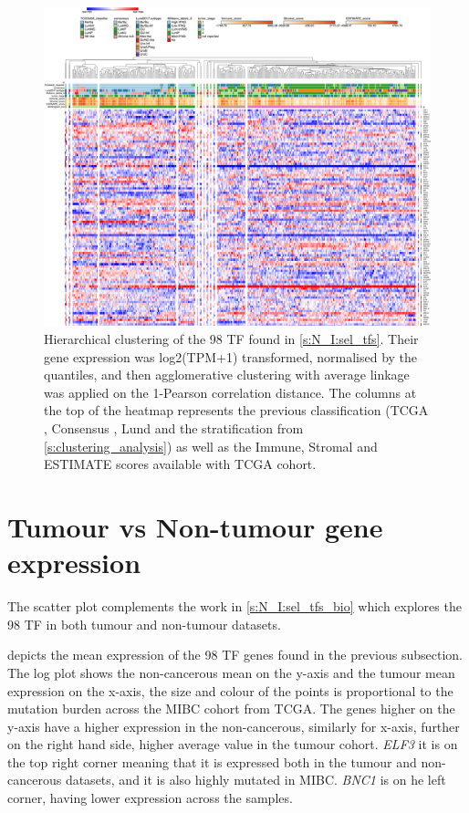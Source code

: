 \begin{figure}
    \centering
    \includegraphics[width=1.0\textwidth,keepaspectratio]{Sections/Network_I/Resources/selective_pruning/15_CS_norm_sel_tfs.png}
      \caption[Heatmap of the clustering of the gene expression of the 98 TF]{Hierarchical clustering of the 98 TF found in \cref{s:N_I:sel_tfs}. 
      Their gene expression was log2(TPM+1) transformed, normalised by the quantiles, and then agglomerative clustering with average linkage was applied on the 1-Pearson correlation distance. The columns at the top of the heatmap represents the previous classification (TCGA \cite{Robertson2017-mg}, Consensus \cite{Kamoun2020-tj}, Lund \cite{Marzouka2018-ge} and the stratification from \cref{s:clustering_analysis}) as well as the Immune, Stromal and ESTIMATE scores available with TCGA cohort.}
    \label{fig:ap:morph_sel_tfs}
\end{figure}

\section{Tumour vs Non-tumour gene expression} \label{s:ap:tum_vs_non-tumour}


The scatter plot complements the work in \cref{s:N_I:sel_tfs_bio} which explores the 98 TF in both tumour and non-tumour datasets.

 depicts the mean expression of the 98 TF genes found in the previous subsection. The log plot shows the non-cancerous mean on the y-axis and the tumour mean expression on the x-axis, the size and colour of the points is proportional to the mutation burden across the MIBC cohort from TCGA. The genes higher on the y-axis have a higher expression in the non-cancerous, similarly for x-axis, further on the right hand side, higher average value in the tumour cohort. \textit{ELF3} it is on the top right corner meaning that it is expressed both in the tumour and non-cancerous datasets, and it is also highly mutated in MIBC. \textit{BNC1} is on he left corner, having lower expression across the samples.


